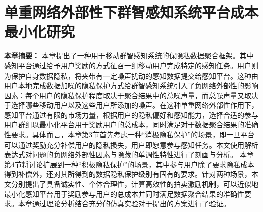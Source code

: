 \chapter{单重网络外部性下群智感知系统平台成本最小化研究}

\textbf{本章摘要：} 
本章提出了一种用于移动群智感知系统的保隐私数据聚合框架。其中感知平台通过给予用户奖励的方式征召一组移动用户完成特定的感知任务。用户则为保护自身数据隐私，将夹带有一定噪声扰动的感知数据提交给感知平台。这种由用户本地完成数据加噪的隐私保护方式给群智感知系统引入了{\kaishu 负网络外部性}的影响因素：每个用户的隐私保护程度取决于聚合结果中的总噪声量，而总噪声量又取决于选择哪些移动用户以及这些用户所添加的噪声。在这种{\kaishu 单重}网络外部性作用下，感知平台通过有限的市场力量，根据用户的隐私偏好和感知能力，选择合适的参与用户群组以最小化平台用于奖励用户的总成本，同时满足对于数据聚合结果的准确性要求。具体而言，本章第3节首先考虑一种“消极隐私保护”的场景，即一旦平台可以通过奖励充分补偿用户的隐私损失，用户即愿意参与感知任务。本文使用解析表达式对问题的负网络外部性因素与隐藏的单调性特性进行了刻画与分析。
本章第4节将讨论扩展到一种“积极隐私保护”的场景，其中参与用户除了要求隐私成本得到补偿外，还对其所得到的数据隐私保护级别有固有的要求。针对两种场景，本文分别提出了具备诚实性、个体合理性，计算高效性的拍卖激励机制，可以近似地最小化感知平台用于奖励参与用户的总成本并同时满足数据聚合结果的准确性要求。本章通过理论分析结合充分的仿真实验对于提出的方案进行了验证。


